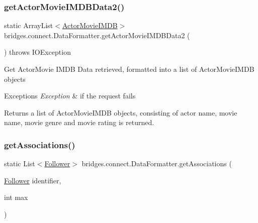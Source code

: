 \subsubsection{\texorpdfstring{get\+Actor\+Movie\+I\+M\+D\+B\+Data2()}{getActorMovieIMDBData2()}}
{\footnotesize\ttfamily static Array\+List$<$\hyperlink{classbridges_1_1data__src__dependent_1_1_actor_movie_i_m_d_b}{Actor\+Movie\+I\+M\+DB}$>$ bridges.\+connect.\+Data\+Formatter.\+get\+Actor\+Movie\+I\+M\+D\+B\+Data2 (\begin{DoxyParamCaption}{ }\end{DoxyParamCaption}) throws I\+O\+Exception\hspace{0.3cm}{\ttfamily [static]}}

Get Actor\+Movie I\+M\+DB Data retrieved, formatted into a list of Actor\+Movie\+I\+M\+DB objects


\begin{DoxyExceptions}{Exceptions}
{\em Exception} & if the request fails\\
\hline
\end{DoxyExceptions}
\begin{DoxyReturn}{Returns}
a list of Actor\+Movie\+I\+M\+DB objects, consisting of actor name, movie name, movie genre and movie rating is returned. 
\end{DoxyReturn}
\mbox{\label{classbridges_1_1connect_1_1_data_formatter_a3877fbdef4320f03dba7f2a6832adfbb}} 
\subsubsection{\texorpdfstring{get\+Associations()}{getAssociations()}\hspace{0.1cm}{\footnotesize\ttfamily [1/5]}}
{\footnotesize\ttfamily static List$<$\hyperlink{classbridges_1_1data__src__dependent_1_1_follower}{Follower}$>$ bridges.\+connect.\+Data\+Formatter.\+get\+Associations (\begin{DoxyParamCaption}\item[{\hyperlink{classbridges_1_1data__src__dependent_1_1_follower}{Follower}}]{identifier,  }\item[{int}]{max }\end{DoxyParamCaption})\hspace{0.3cm}{\ttfamily [static]}}

